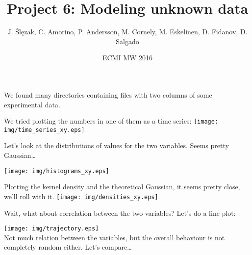 \documentclass{beamer}
\begin{document}
\title{Project 6: Modeling unknown data}
\date{ECMI MW 2016}
\author{J. \'Sl\k{e}zak, C. Amorino, P. Andersson, M. Cornely, M. Eskelinen,  D. Fidanov, D. Salgado}

\begin{frame}
\maketitle
\end{frame}

\begin{frame}
We found many directories containing files with two columns of some experimental data. 

We tried plotting the numbers in one of them as a time series:
  \centering
\texttt{[image: img/time\_series\_xy.eps]}
\end{frame}

\begin{frame}
Let's look at the distributions of values for the two variables. Seems pretty Gaussian\dots

\centering
\texttt{[image: img/histograms\_xy.eps]}
\end{frame}

%
%


\begin{frame}
Plotting the kernel density and the theoretical Gaussian, it seems pretty close, we'll roll with it.
\centering
\texttt{[image: img/densities\_xy.eps]}
\end{frame}

\begin{frame}
Wait, what about correlation between the two variables? Let's do a line plot:

\centering
\texttt{[image: img/trajectory.eps]}\\
Not much relation between the variables, but the overall behaviour is not completely random either. Let's compare\dots
\end{frame}
\end{document}
